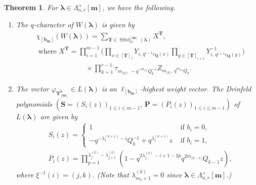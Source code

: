 \documentclass[12pt]{amsart}
\newtheorem{thm}{Theorem}[section]
\numberwithin{equation}{thm}
\newcommand\bP{\mathbf P}
\newcommand\bQ{\mathbf Q}
\newcommand\bS{\mathbf S}
\newcommand\bT{\mathbf T}
\newcommand\bb{\mathbf b}
\renewcommand\bm{\mathbf m} %
\newcommand\la{\lambda}
\newcommand\vf{\varphi}
\newcommand\vL{\varLambda}
\newcommand\Bla{\boldsymbol\lambda}
\newcommand\lan{\langle}
\newcommand\ran{\rangle}
\newcommand{\SStd}{\operatorname{SStd}}
\begin{document}
\begin{thm}
\label{Thm qcha cell}
For $\Bla \in \vL_{n,r}^+[\bm]$, we have the following.  

\begin{enumerate}
\item 
The $q$-character of $W(\Bla)$ is given by 
\begin{align*}
&\chi_{[\bb_{\bm}]} (W(\Bla)) = \sum_{\bT \in \SStd_m^{[\bm]} (\Bla)} X^{\bT}, 
\\
&\text{ where }
X^{\bT} = \prod_{i=1}^{m-1} \Big( \prod_{x \in [\bT]_i} Y_{i, \, q^{i-1} c_{\bQ}(x)} 
				\prod_{y \in [\bT]_{i+1}} Y^{-1}_{i, \, q^{i+1} c_{\bQ} (y)} \Big) 
		\\ & \hspace{7em} \times 
		\prod_{k=1}^{r-1} \tau_{m_{\lan k \ran}, \, - q^{- m_{\lan k \ran}} Q_k^{-1}} 
				Z_{m_{\lan k \ran}, \, q^{m_{\lan k \ran}} Q_k}. 
\end{align*}

\item 
The vector $\vf_{\bT^{\Bla}_{[\bm]}} \in L(\Bla)$ is an $\ell_{[\bb_{\bm}]}$-highest weight vector.  
The Drinfeld polynomials $(\bS=(S_i(z))_{1 \leq i \leq m-1}, \, \bP =(P_i(z))_{1 \leq i \leq m-1} )$ of $L(\Bla)$ 
are given by 
\begin{align*}
&S_i(z)= \begin{cases}
		1 & \text{ if } b_i=0, 
		\\
		- q^{- \la_1^{(k+1)} -i} Q_k^{-1}  + q^{ \la_1^{(k+1)} }  z 
		& \text{ if } b_i=1, 
	\end{cases}
\\
& 
P_i(z) = \prod_{p=1}^{\la_j^{(k)} - \la_{j+1}^{(k)}} (1 - q^{ 2 \la_j^{(k)}  - i+1 - 2p} q^{ 2 m_{\lan k-1 \ran}} Q_{k-1} z), 
\end{align*}
where  $\xi^{-1} (i) =(j,k)$. 
(Note that $\la_{m_k +1}^{(k)} =0$ since $\Bla \in \vL_{n,r}^+[\bm]$.) 
\end{enumerate}


\end{thm}
\end{document}

